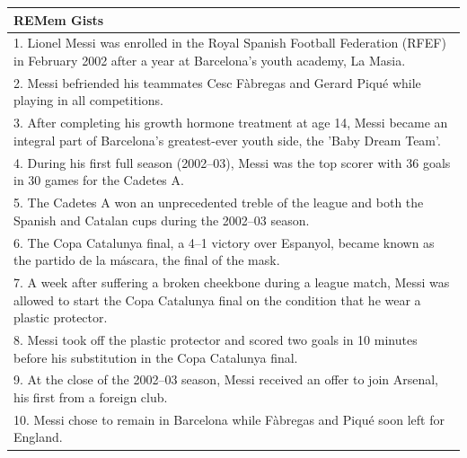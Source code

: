 \documentclass{article} %
\newcommand{\ours}{REMem\xspace}
\begin{document}
\begin{longtable}{p{\dimexpr\textwidth-2\tabcolsep}}
\textbf{\ours Gists} \\ 
\midrule
1. Lionel Messi was enrolled in the Royal Spanish Football Federation (RFEF) in February 2002 after a year at Barcelona's youth academy, La Masia. \\
2. Messi befriended his teammates Cesc Fàbregas and Gerard Piqué while playing in all competitions. \\
3. After completing his growth hormone treatment at age 14, Messi became an integral part of Barcelona's greatest-ever youth side, the 'Baby Dream Team'. \\
4. During his first full season (2002–03), Messi was the top scorer with 36 goals in 30 games for the Cadetes A. \\
5. The Cadetes A won an unprecedented treble of the league and both the Spanish and Catalan cups during the 2002–03 season. \\
6. The Copa Catalunya final, a 4–1 victory over Espanyol, became known as the partido de la máscara, the final of the mask. \\
7. A week after suffering a broken cheekbone during a league match, Messi was allowed to start the Copa Catalunya final on the condition that he wear a plastic protector. \\
8. Messi took off the plastic protector and scored two goals in 10 minutes before his substitution in the Copa Catalunya final. \\
9. At the close of the 2002–03 season, Messi received an offer to join Arsenal, his first from a foreign club. \\
10. Messi chose to remain in Barcelona while Fàbregas and Piqué soon left for England. \\
\midrule


\end{longtable}
\end{document}
